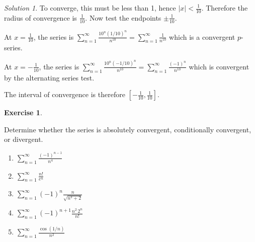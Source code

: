 \documentclass[
]{book}
\providecommand{\tightlist}{%
  \setlength{\itemsep}{0pt}\setlength{\parskip}{0pt}}
\theoremstyle{definition}
\theoremstyle{definition}
\theoremstyle{definition}
\newtheorem{exercise}{Exercise}[chapter]
\theoremstyle{definition}
\theoremstyle{remark}
\newtheorem*{solution}{Solution}
\begin{document}
\begin{solution}
To converge, this must be less than 1, hence \(\displaystyle |x| < \frac{1}{10}\). Therefore the radius of convergence is
\(\frac{1}{10}\). Now test the endpoints \(\pm \frac{1}{10}\).

At \(x=\frac{1}{10}\), the series is \(\displaystyle \sum_{n=1}^\infty \frac{10^n (1/10)^n}{n^{10}} = \sum_{n=1}^\infty \frac{1}{n^{10}}\) which
is a convergent \(p\)-series.

At \(x=-\frac{1}{10}\), the series is \(\displaystyle \sum_{n=1}^\infty \frac{10^n (-1/10)^n}{n^{10}} = \sum_{n=1}^\infty \frac{(-1)^n}{n^{10}}\)
which is convergent by the alternating series test.

The interval of convergence is therefore \(\displaystyle \left[-\frac{1}{10},\frac{1}{10}\right]\).

\end{solution}

\begin{exercise}
\protect\hypertarget{exr:unlabeled-div-285}{}\label{exr:unlabeled-div-285}

Determine whether the series is absolutely convergent, conditionally convergent, or divergent.

\begin{enumerate}
\def\labelenumi{\arabic{enumi}.}
\tightlist
\item
  \(\displaystyle{\sum_{n=1}^\infty \frac{(-1)^{n-1}}{n^4}}\)
\item
  \(\displaystyle{\sum_{n=1}^\infty \frac{n!}{e^n}}\)
\item
  \(\displaystyle{\sum_{n=1}^\infty(-1)^{n} \frac{n}{\sqrt{n^3+2}}}\)
\item
  \(\displaystyle{\sum_{n=1}^\infty(-1)^{n+1} \frac{n^2 \,2^n}{n!}}\)
\item
  \(\displaystyle \sum_{n=1}^{\infty} \frac{\cos(1/n)}{n^2}\)
\end{enumerate}

\end{exercise}
\end{document}
